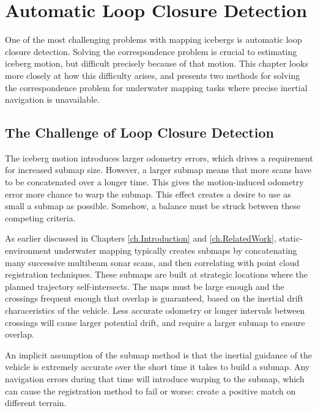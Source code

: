 
\chapter{Automatic Loop Closure Detection}
\label{ch.LoopClosure}

One of the most challenging problems with mapping icebergs is automatic loop closure detection. Solving the correspondence problem is crucial to estimating iceberg motion, but difficult precisely because of that motion. This chapter looks more closely at how this difficulty arises, and presents two methods for solving the correspondence problem for underwater mapping tasks where precise inertial navigation is unavailable.

\section{The Challenge of Loop Closure Detection}

The iceberg motion introduces larger odometry errors, which drives a requirement for increased submap size. However, a larger submap means that more scans have to be concatenated over a longer time. This gives the motion-induced odometry error more chance to warp the submap. This effect creates a desire to use as small a submap as possible. Somehow, a balance must be struck between these competing criteria. 

As earlier discussed in Chapters \ref{ch.Introduction} and \ref{ch.RelatedWork}, static-environment underwater mapping typically creates submaps by concatenating many successive multibeam sonar scans, and then correlating with point cloud registration techniques. These submaps are built at strategic locations where the planned trajectory self-intersects. The maps must be large enough and the crossings frequent enough that overlap is guaranteed, based on the inertial drift characeristics of the vehicle. Less accurate odometry or longer intervals between crossings will cause larger potential drift, and require a larger submap to ensure overlap.

An implicit assumption of the submap method is that the inertial guidance of the vehicle is extremely accurate over the short time it takes to build a submap. Any navigation errors during that time will introduce warping to the submap, which can cause the registration method to fail or worse: create a positive match on different terrain. 

